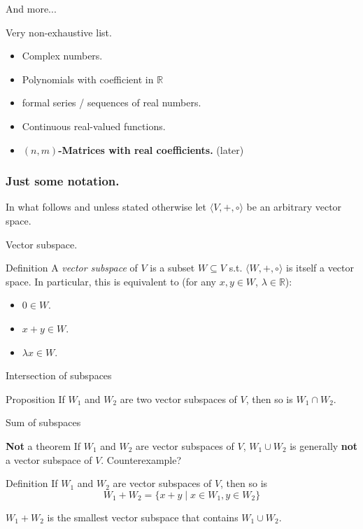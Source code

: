 \documentclass{beamer}
\begin{document}
\begin{frame}{And more...}
  \begin{exampleblock}{Very non-exhaustive list.}
    \begin{itemize}
    \item Complex numbers.
    \item Polynomials with coefficient in $\mathbb{R}$
    \item formal series / sequences of real numbers.
    \item Continuous real-valued functions.
    \item \textbf{$(n,m)$-Matrices with real coefficients.} (later)
    \end{itemize}
  \end{exampleblock}
\end{frame}

\begin{frame}
  \frametitle{Just some notation.}
  In what follows and unless stated otherwise let $\langle V, +, \circ \rangle$ be an arbitrary vector space.
\end{frame}

\begin{frame}{Vector subspace.}
  \begin{block}{Definition}
    A \emph{vector subspace} of $V$ is a subset $W \subseteq V$ s.t. $\langle W, +, \circ \rangle$ is itself a vector space.
    In particular, this is equivalent to (for any $x,y \in W$, $\lambda \in \mathbb{R}$):
    \begin{itemize}
    \item $0 \in W$.
    \item $x + y \in W$.
    \item $\lambda x \in W$. 
    \end{itemize}
  \end{block}
\end{frame}

\begin{frame}{Intersection of subspaces}
  \begin{block}{Proposition}
    If $W_1$ and $W_2$ are two vector subspaces of $V$, then so is $W_1 \cap W_2$.
  \end{block}
\end{frame}

\begin{frame}{Sum of subspaces}
  \begin{alertblock}{\textbf{Not} a theorem}
    If $W_1$ and $W_2$ are vector subspaces of $V$, $W_1 \cup W_2$ is generally \textbf{not} a vector subspace of $V$. Counterexample?
  \end{alertblock}

  \begin{block}{Definition}
    If $W_1$ and $W_2$ are vector subspaces of $V$, then so is
    \[W_1 + W_2 = \{x + y \mid x \in W_1, y \in W_2\}\]
  \end{block}

  $W_1 + W_2$ is the smallest vector subspace that contains $W_1 \cup W_2$.
\end{frame}
\end{document}
